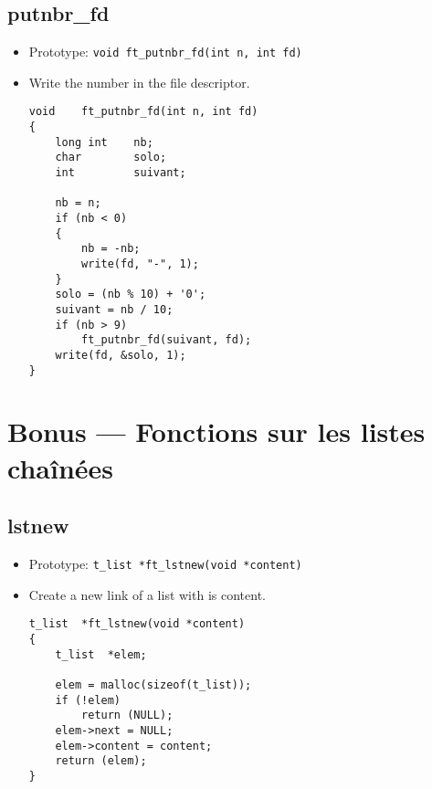 \documentclass{article}
\begin{document}
	\subsection{putnbr\_fd}
		\begin{itemize}[label=$\rightarrow$]
			\item Prototype: \texttt{void    ft\_putnbr\_fd(int n, int fd)}
			\item Write the number in the file descriptor.
			\begin{verbatim}
void    ft_putnbr_fd(int n, int fd)                                             
{                                                                               
    long int    nb;                                                             
    char        solo;                                                           
    int         suivant;                                                        
                                                                                
    nb = n;                                                                     
    if (nb < 0)                                                                 
    {                                                                           
        nb = -nb;                                                               
        write(fd, "-", 1);                                                      
    }                                                                           
    solo = (nb % 10) + '0';                                                     
    suivant = nb / 10;                                                          
    if (nb > 9)                                                                 
        ft_putnbr_fd(suivant, fd);                                              
    write(fd, &solo, 1);                                                        
}
			\end{verbatim}
		\end{itemize}
	
	\section{Bonus — Fonctions sur les listes chaînées}
	
		\subsection{lstnew}
			\begin{itemize}[label=$\rightarrow$]
				\item Prototype: \texttt{t\_list *ft\_lstnew(void *content)}
				\item Create a new link of a list with is content.
				\begin{verbatim}
t_list	*ft_lstnew(void *content)
{
	t_list	*elem;

	elem = malloc(sizeof(t_list));
	if (!elem)
		return (NULL);
	elem->next = NULL;
	elem->content = content;
	return (elem);
}
				\end{verbatim}
			\end{itemize}
		
\end{document}
